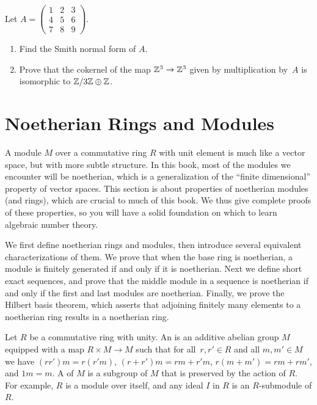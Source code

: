 \begin{exercise}
	Let $A=\left(
	        \begin{matrix}1&2&3\\4&5&6\\7&8&9
	        \end{matrix}\right)$. 
	\begin{enumerate}
	\item Find the Smith normal form of $A$.
	\item Prove that 
	the cokernel of the map $\mathbb{Z}^3\to \mathbb{Z}^3$ given by multiplication by~$A$ 
	is isomorphic to $\mathbb{Z}/3\mathbb{Z} \oplus \mathbb{Z}$.
	\end{enumerate}
\end{exercise}

\section{Noetherian Rings and Modules}\label{sec:noetherian}

A module $M$ over a commutative ring $R$ with unit element is much
like a vector space, but with more subtle structure.  In this book,
most of the modules we encounter will be noetherian, which is a
generalization of the ``finite dimensional'' property of vector
spaces.  This section is about properties of noetherian modules (and
rings), which are crucial to much of this book.  We thus
give complete proofs of these properties, so you will have a solid
foundation on which to learn algebraic number theory.

We first define noetherian rings and modules, then introduce several
equivalent characterizations of them.  We prove that when the
base ring is noetherian, a module is finitely generated if and only if
it is noetherian.  Next we define short exact sequences, and prove
that the middle module in a sequence is noetherian if and only if the
first and last modules are noetherian.  Finally, we prove the Hilbert
basis theorem, which asserts that adjoining finitely many elements
to a noetherian ring results in a noetherian ring. 

Let $R$ be a commutative ring with unity.
An  is an additive abelian
group $M$ equipped with a map $R\times M \to M$ such that for all~$r,
r'\in R$ and all $m, m'\in M$ we have $(r r')m = r(r' m )$, $(r + r')m
= rm + r' m$, $r(m+m') = rm + rm'$, and $1m=m$.  A  of $M$
is a subgroup of $M$ that is preserved by the action of $R$.
For example, $R$ is a module over itself, and 
any ideal $I$ in $R$ is an $R$-submodule of $R$.

